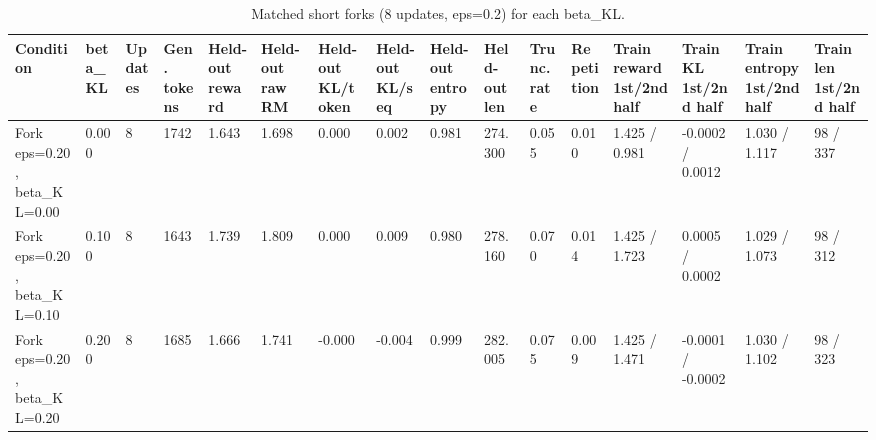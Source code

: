 \begin{table}[t]
\centering
\small
\caption{Matched short forks (8 updates, eps=0.2) for each beta\_KL.}
\begin{tabular}{llllllllllllllll}
\toprule
Condition & beta\_KL & Updates & Gen. tokens & Held-out reward & Held-out raw RM & Held-out KL/token & Held-out KL/seq & Held-out entropy & Held-out len & Trunc. rate & Repetition & Train reward 1st/2nd half & Train KL 1st/2nd half & Train entropy 1st/2nd half & Train len 1st/2nd half \\
\midrule
Fork eps=0.20, beta\_KL=0.00 & 0.000 & 8 & 1742 & 1.643 & 1.698 & 0.000 & 0.002 & 0.981 & 274.300 & 0.055 & 0.010 & 1.425 / 0.981 & -0.0002 / 0.0012 & 1.030 / 1.117 & 98 / 337 \\
Fork eps=0.20, beta\_KL=0.10 & 0.100 & 8 & 1643 & 1.739 & 1.809 & 0.000 & 0.009 & 0.980 & 278.160 & 0.070 & 0.014 & 1.425 / 1.723 & 0.0005 / 0.0002 & 1.029 / 1.073 & 98 / 312 \\
Fork eps=0.20, beta\_KL=0.20 & 0.200 & 8 & 1685 & 1.666 & 1.741 & -0.000 & -0.004 & 0.999 & 282.005 & 0.075 & 0.009 & 1.425 / 1.471 & -0.0001 / -0.0002 & 1.030 / 1.102 & 98 / 323 \\
\bottomrule
\end{tabular}
\end{table}
